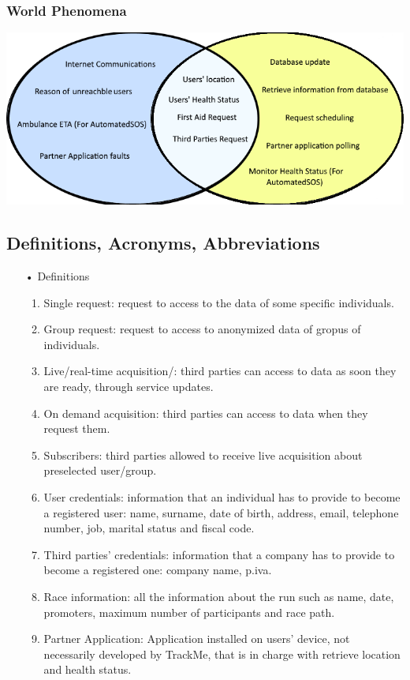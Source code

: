 \subsubsection{World Phenomena}
\begin{center}
\includegraphics[scale=0.8]{Images/WordPhen.png}
\end{center}

\subsection{Definitions, Acronyms, Abbreviations}

\begin{enumerate}
\item[•] {\Large Definitions}
	\begin{enumerate}
		\item Single request: request to access to the data of some specific  individuals.
		\item Group request: request to access to anonymized data of gropus of individuals.
		\item Live/real-time acquisition/: third parties can access to data as soon they are ready, 				through service updates.
		\item On demand acquisition: third parties can access to data when they request 				them.
		\item Subscribers: third parties allowed to receive live acquisition about 						preselected	user/group.
		\item User credentials: information that an individual has to provide to become a 				registered user: name, surname, date of birth, address, email, telephone
			number, job, marital status and fiscal code. 
		\item Third parties' credentials: information that a company has to provide to 					become a registered one: company name, p.iva.
		\item Race information: all the information about the run such as name, date, promoters, 				maximum number of participants and race path.
		\item Partner Application: Application installed on users' device, not necessarily developed by TrackMe, that is in charge with retrieve location and health status. 
	\end{enumerate}
\end{enumerate}

